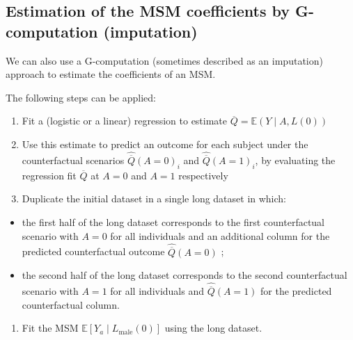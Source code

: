 \documentclass[
]{book}
\providecommand{\tightlist}{%
  \setlength{\itemsep}{0pt}\setlength{\parskip}{0pt}}
\begin{document}
\subsection{Estimation of the MSM coefficients by G-computation (imputation)}\label{estimation-of-the-msm-coefficients-by-g-computation-imputation}

We can also use a G-computation (sometimes described as an imputation) approach to estimate the coefficients of an MSM.

The following steps can be applied:

\begin{enumerate}
\def\labelenumi{\arabic{enumi}.}
\item
  Fit a (logistic or a linear) regression to estimate \(\overline{Q} = \mathbb{E}(Y \mid A, L(0))\)
\item
  Use this estimate to predict an outcome for each subject under the counterfactual scenarios \(\hat{\overline{Q}}(A=0)_i\) and \(\hat{\overline{Q}}(A=1)_i\), by evaluating the regression fit \(\overline{Q}\) at \(A=0\) and \(A=1\) respectively
\item
  Duplicate the initial dataset in a single long dataset in which:
\end{enumerate}

\begin{itemize}
\tightlist
\item
  the first half of the long dataset corresponds to the first counterfactual scenario with \(A=0\) for all individuals and an additional column for the predicted counterfactual outcome \(\hat{\overline{Q}}(A=0)\) ;
\item
  the second half of the long dataset corresponds to the second counterfactual scenario with \(A=1\) for all individuals and \(\hat{\overline{Q}}(A=1)\) for the predicted counterfactual column.
\end{itemize}

\begin{enumerate}
\def\labelenumi{\arabic{enumi}.}
\setcounter{enumi}{3}
\tightlist
\item
  Fit the MSM \(\mathbb{E}\left[Y_a \mid L_\text{male}(0)\right]\) using the long dataset.
\end{enumerate}
\end{document}
